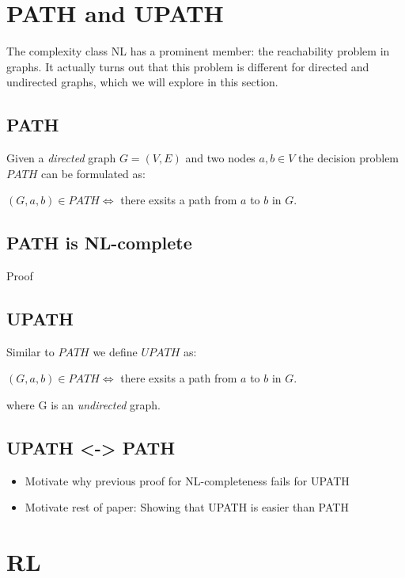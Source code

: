 \chapter{PATH and UPATH}\label{path-and-upath}

The complexity class NL has a prominent member: the reachability problem
in graphs. It actually turns out that this problem is different for
directed and undirected graphs, which we will explore in this section.

\section{PATH}\label{path}

Given a \emph{directed} graph $G = (V, E)$ and two nodes $a, b \in V$
the decision problem $PATH$ can be formulated as:

$(G, a, b) \in PATH \Leftrightarrow $ there exsits a path from $a$ to
$b$ in $G$.

\section{PATH is NL-complete}\label{path-is-nl-complete}

Proof

\section{UPATH}\label{upath}

Similar to $PATH$ we define $UPATH$ as:

$(G, a, b) \in PATH \Leftrightarrow $ there exsits a path from $a$ to
$b$ in $G$.

where G is an \emph{undirected} graph.

\section{UPATH \textless{}-\textgreater{} PATH}\label{upath---path}

\begin{itemize}
\itemsep1pt\parskip0pt
\item
  Motivate why previous proof for NL-completeness fails for UPATH
\item
  Motivate rest of paper: Showing that UPATH is easier than PATH
\end{itemize}

\chapter{RL}\label{rl}

